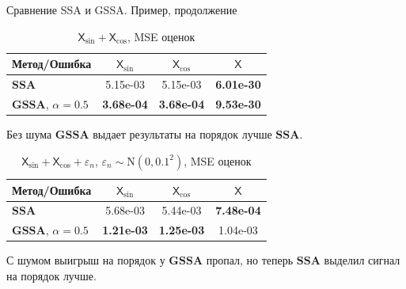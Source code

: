 \documentclass[notheorems, handout]{beamer}
\newcommand{\SSA}{\textbf{SSA}}
\newcommand{\GSSA}{\textbf{GSSA}}
\newcommand{\TS}{\mathsf{X}}
\begin{document}
	
	\begin{frame}{Сравнение SSA и GSSA. Пример, продолжение}
		\begin{table}[H]
			\caption{$\TS_{\sin} + \TS_{\cos}$, MSE оценок}
			\centering
			\begin{tabular}{l|ccc}
				\hline
				Метод/Ошибка & $\TS_{\sin}$ & $\TS_{\cos}$ & $\TS$ \\ 
				\hline
				$\SSA$   & 5.15e-03 & 5.15e-03 & \textbf{6.01e-30}\\ 
				$\GSSA$, $\alpha = 0.5$  & \textbf{3.68e-04} & \textbf{3.68e-04} & \textbf{9.53e-30} \\ 
				\hline
			\end{tabular}
			\label{tab:mse_ssa_gssa}
		\end{table}
		Без шума $\GSSA$ выдает результаты на порядок лучше $\SSA$.

		\begin{table}[H]
			\caption{$\TS_{\sin} + \TS_{\cos}+
		\varepsilon_n$, $\varepsilon_n \sim \mathrm N(0, 0.1^2)$, MSE оценок }
			\centering
			\begin{tabular}{l|ccc}
				\hline
				Метод/Ошибка & $\TS_{\sin}$ & $\TS_{\cos}$ & $\TS$ \\ 
				\hline
				$\SSA$      & 5.68e-03 & 5.44e-03 & \textbf{7.48e-04}  \\ 
				$\GSSA$, $\alpha = 0.5$ & \textbf{1.21e-03} & \textbf{1.25e-03} & 1.04e-03 \\
				\hline
			\end{tabular}
			\label{tab:errs_ssa_gssa}
		\end{table}
		
		С шумом выигрыш на порядок у $\GSSA$ пропал, но теперь $\SSA$ выделил сигнал на порядок лучше.

	\end{frame}
	
	
	
\end{document}
